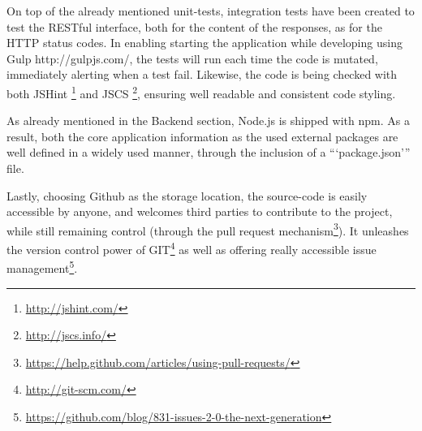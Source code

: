 On top of the already mentioned unit-tests, integration tests have been created
to test the RESTful interface, both for the content of the responses, as for the
HTTP status codes. In enabling starting the application while developing using 
Gulp http://gulpjs.com/, 
the tests will run each time the code is mutated, immediately alerting
when a test fail. Likewise, the code is being checked with both 
JSHint \footnote{\url{http://jshint.com/}}
and JSCS \footnote{\url{http://jscs.info/}}, 
ensuring well readable and consistent code styling.

As already mentioned in the Backend section, Node.js is shipped with npm. As a
result, both the core application information as the used external packages are 
well defined in a widely used manner, through the inclusion of a 
```package.json''' file.

Lastly, choosing Github as the storage location, the \gls{source-code} is easily
accessible by anyone, and welcomes third parties to contribute to the project, 
while still remaining control (through the pull request 
mechanism\footnote{\url{https://help.github.com/articles/using-pull-requests/}}). 
It unleashes the version control power of GIT\footnote{\url{http://git-scm.com/}}
as well as offering really accessible issue 
management\footnote{\url{https://github.com/blog/831-issues-2-0-the-next-generation}}.
